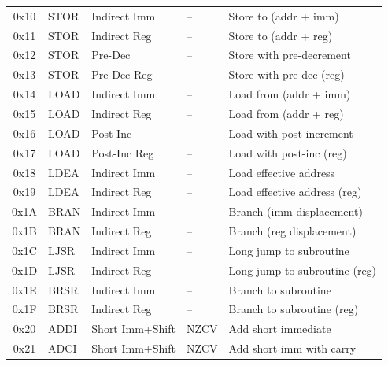 \begin{table}[H]
\begin{tabular}{clllp{4cm}}
		\midrule
		0x10            & STOR              & Indirect Imm    & --             & Store to (addr + imm)         \\
		0x11            & STOR              & Indirect Reg    & --             & Store to (addr + reg)         \\
		0x12            & STOR              & Pre-Dec         & --             & Store with pre-decrement      \\
		0x13            & STOR              & Pre-Dec Reg     & --             & Store with pre-dec (reg)      \\
		0x14            & LOAD              & Indirect Imm    & --             & Load from (addr + imm)        \\
		0x15            & LOAD              & Indirect Reg    & --             & Load from (addr + reg)        \\
		0x16            & LOAD              & Post-Inc        & --             & Load with post-increment      \\
		0x17            & LOAD              & Post-Inc Reg    & --             & Load with post-inc (reg)      \\
		0x18            & LDEA              & Indirect Imm    & --             & Load effective address        \\
		0x19            & LDEA              & Indirect Reg    & --             & Load effective address (reg)  \\
		0x1A            & BRAN              & Indirect Imm    & --             & Branch (imm displacement)     \\
		0x1B            & BRAN              & Indirect Reg    & --             & Branch (reg displacement)     \\
		0x1C            & LJSR              & Indirect Imm    & --             & Long jump to subroutine       \\
		0x1D            & LJSR              & Indirect Reg    & --             & Long jump to subroutine (reg) \\
		0x1E            & BRSR              & Indirect Imm    & --             & Branch to subroutine          \\
		0x1F            & BRSR              & Indirect Reg    & --             & Branch to subroutine (reg)    \\
		\midrule
		0x20            & ADDI              & Short Imm+Shift & NZCV           & Add short immediate           \\
		0x21            & ADCI              & Short Imm+Shift & NZCV           & Add short imm with carry      \\

\end{tabular}
\end{table}
